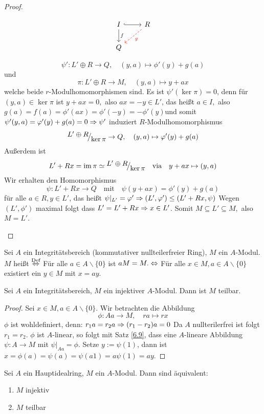\begin{proof}
\begin{enumerate}
\begin{minipage}[t]{0.7\textwidth}
		\end{minipage}
		\begin{minipage}[t]{0.3\textwidth} 
			$$\begin{tikzcd}
			I \arrow[hook]{r} \arrow{d}{f}& R \arrow[dashed,red]{dl}{g}\\ Q &
			\end{tikzcd}$$
		\end{minipage}
	 $$\psi': L' \oplus R \to Q,\quad (y,a) \mapsto \phi'(y) + g(a) $$
	und 
	$$\pi: L' \oplus R \to M,\quad(y,a) \mapsto y +ax$$
		welche beide $r$-Modulhomomorphismen sind. Es ist $\psi'(\ker\pi) = 0$, denn für $(y,a) \in \ker\pi$ ist $ y+ax=0,$ also $ax=-y \in L'$, das heißt $a \in I,$ also $g(a)=f(a)=\phi'(ax)=\phi'(-y) = -\phi'(y) $und somit $\psi'(y,a) = \varphi'(y)+g(a) = 0 \Rightarrow \psi'$ induziert $R$-Modulhomomorphismus $$\QR{L' \oplus R}{\ker\pi} \to Q, \quad(y,a) \mapsto \phi'(y)+g(a)$$
		 Außerdem ist $$L'+Rx = \im\pi \simeq \QR{L' \oplus R}{\ker\pi} \quad \text{via}\quad y+ax \mapsto (y,a)$$
		 Wir erhalten den Homomorphismus $$\psi:L'+Rx \to Q \quad \text{mit} \quad\psi(y+ax) = \phi'(y)+g(a) $$ für alle $a \in R, y \in L' $, das heißt $\psi|_{L'} = \varphi' \Rightarrow (L',\varphi') \leq (L'+Rx, \psi) $ Wegen $(L',\phi') $ maximal folgt dass $ L'=L'+Rx \Rightarrow x \in L' $. Somit $M \subseteq L' \subseteq M, $ also $M = L'$.
	\end{enumerate}
\end{proof}
\begin{df}\label{6.10}
	Sei $A$ ein Integritätsbereich (kommutativer nullteilerfreier Ring), $M$ ein $A$-Modul. $M$ heißt  $\overset{\text{Def}}{\Leftrightarrow}$ Für alle $a\in A \backslash \{0\}$ ist $ aM=M. \Leftrightarrow$ Für alle $x \in M, a \in A \backslash \{0\}$ existiert ein $y\in M $ mit $x=ay$.
\end{df}
\begin{bem}\label{6.11}
	Sei $A$ ein Integritätsbereich, $M$ ein injektiver $A$-Modul. Dann ist $M$ teilbar.
\end{bem}
\begin{proof}
	Sei $x \in M , a \in A \backslash \{0\}$. Wir betrachten die Abbildung $$\phi: Aa \to M, \quad ra \mapsto rx$$ $\phi$ ist wohldefiniert, denn: $ r_1a= r_2a \Rightarrow (r_1-r_2)a =0 $ Da $A$ nullterilerfrei ist folgt $r_1=r_2 $. $ \phi$ ist $A$-linear, so folgt mit Satz \ref{6.9}, dass eine $A$-lineare Abbildung $\psi: A \to M $ mit $\psi|_{Aa} = \phi$. Setze $y:= \psi(1)$, dann ist $ x = \phi(a)=\psi(a) = \psi(a 1) = a\psi(1)=ay.$
\end{proof}
\begin{bem}\label{6.12}
	Sei $A$ ein Hauptidealring, $M$ ein $A$-Modul. Dann sind äquivalent: 
	\begin{enumerate} [label= \roman*)]
		\item $M$ injektiv 
		\item $M$ teilbar 
	\end{enumerate}
\end{bem}
